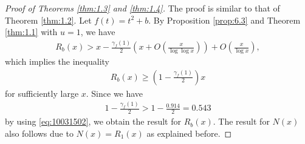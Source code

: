 \documentclass[a4paper,11pt]{amsart}
\theoremstyle{definition}
\numberwithin{equation}{section}
\begin{document}
\begin{proof}[Proof of Theorems \ref{thm:1.3} and \ref{thm:1.4}]
The proof is similar to that of Theorem \ref{thm:1.2}. 
Let $f(t)=t^2+b$. 
By Proposition \ref{prop:6.3} and Theorem \ref{thm:1.1} with $u=1$, we have 
\begin{align*}
R_b(x)
> x- \frac{\gamma_f(1)}{2} \left(x+O\left(\frac{x}{\log\log{x}}\right)\right) 
+ O\left(\frac{x}{\log{x}}\right), 
\end{align*}
which implies the inequality
\begin{align*}
R_b(x)
\geq \left(1-\frac{\gamma_f(1)}{2}\right)x
\end{align*}
for sufficiently large $x$. 
Since we have 
\begin{align*}
1-\frac{\gamma_f(1)}{2}
> 1-\frac{0.914}{2}
= 0.543
\end{align*}
by using \eqref{eq:10031502}, we obtain the result for $R_b(x)$. 
The result for $N(x)$ also follows due to $N(x)=R_1(x)$ as explained before. 
\end{proof}


%
%
\end{document}
